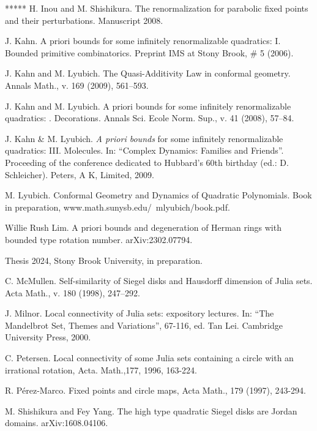 \documentclass{amsart}
\newcommand{\1}{{\mathbb 1 }}
\theoremstyle{remark}
\numberwithin{equation}{section}
\theoremstyle{definition}
\newcommand{\RN}[1]{\MakeUppercase{\romannumeral#1}}%
\begin{document}
\begin{thebibliography}{*****}
 H. Inou and M. Shishikura.
  The renormalization for parabolic fixed points and their
  perturbations. Manuscript 2008. 

  J. Kahn. A priori bounds for some infinitely
  renormalizable quadratics: I. Bounded primitive
  combinatorics. Preprint IMS at Stony Brook, \# 5 (2006). 


 J. Kahn and M. Lyubich. The Quasi-Additivity Law in conformal geometry. Annals Math., v. 169 (2009), 561--593.

   J. Kahn and M. Lyubich. A priori bounds for some infinitely renormalizable quadratics: \RN{2}. Decorations. Annals Sci. Ecole Norm. Sup., v. 41 (2008), 57--84.


 J. Kahn \& M. Lyubich. {\it A priori bounds} for some infinitely
renormalizable quadratics: III.  Molecules.  In: ``Complex Dynamics: Families and Friends''.
    Proceeding of the conference dedicated to Hubbard's 60th birthday (ed.:  D. Schleicher). 
    Peters, A K, Limited, 2009. 


 M. Lyubich. Conformal Geometry and Dynamics of
  Quadratic Polynomials. Book in preparation, www.math.sunysb.edu/~mlyubich/book.pdf. 


 Willie Rush Lim. A priori bounds and degeneration of Herman rings with bounded type rotation number. arXiv:2302.07794.

\noindent Thesis 2024, Stony Brook University, in preparation.



 C. McMullen. Self-similarity of Siegel disks and Hausdorff dimension of Julia sets.
  Acta Math., v. 180 (1998), 247--292.  

 J. Milnor.
     Local connectivity of Julia sets: expository lectures.
     In: ``The Mandelbrot Set, Themes and Variations'',  67-116, ed. Tan Lei.  
     Cambridge University Press, 2000.




 C. Petersen. Local connectivity of some Julia sets containing a circle with an irrational rotation, Acta. Math.,177, 1996, 163-224.


  R. P\'erez-Marco. Fixed points and circle maps, Acta Math., 179 (1997), 243-294.


 M. Shishikura and Fey Yang. The high type quadratic Siegel disks are Jordan domains. arXiv:1608.04106.


\end{thebibliography}
\end{document}
